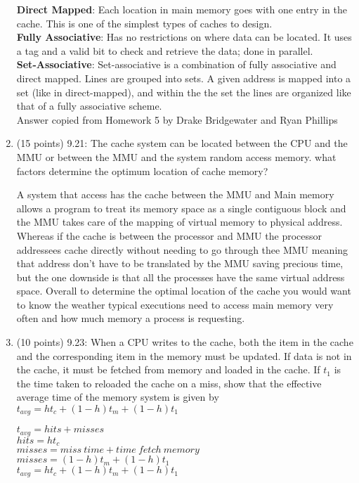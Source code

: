 \documentclass[letterpaper,10pt,onecolumn,titlepage]{article}
\begin{document}
\begin{enumerate}
\begin{mdframed}[style=MyFrame]
\textbf{Direct Mapped}: Each location in main memory goes with one entry in the cache. This is one of the simplest types of caches to design.\\
\textbf{Fully Associative}: Has no restrictions on where data can be located. It uses a tag and a valid bit to check and retrieve the data; done in parallel. \\
\textbf{Set-Associative}: Set-associative is a combination of fully associative and direct mapped. Lines are grouped into sets. A given address is mapped into a set (like in direct-mapped), and within the the set the lines are organized like that of a fully associative scheme. \\
Answer copied from Homework 5 by Drake Bridgewater and Ryan Phillips \cite{HW5}
\end{mdframed}
\item (15 points) 9.21: The cache system can be located between the CPU and the MMU or between the MMU and the system random access memory. what factors determine the optimum location of cache memory?
\begin{mdframed}[style=MyFrame]
A system that access has the cache between the MMU and Main memory allows a program to treat its memory space as a single contiguous block and the MMU takes care of the mapping of virtual memory to physical address.  Whereas if the cache is between the processor and MMU the processor addressees cache directly without needing to go through thee MMU meaning that address don't have to be translated by the MMU saving precious time, but the one downside is that all the processes have the same virtual address space. Overall to determine the optimal location of the cache you would want to know the weather typical executions need to access main memory very often and how much memory a process is requesting. 
\end{mdframed}

\newpage
\item (10 points) 9.23: When a CPU  writes to the cache, both the item in the cache and the corresponding item in the memory must be updated. If data is not in the cache, it must be fetched from memory and loaded in the cache. If $t_1$ is the time taken to reloaded the cache on a miss, show that the effective average time of the memory system is given by $t_{avg}=ht_c+(1-h)t_m+(1-h)t_1$

\begin{mdframed}[style=MyFrame]
 $t_{avg}=hits+misses$\\
 $hits=ht_c$\\
 $misses=miss~time+time~fetch~memory$\\
 $misses=(1-h)t_m+(1-h)t_1$\\
 $t_{avg}=ht_c+(1-h)t_m+(1-h)t_1$
 

\end{mdframed}
\end{enumerate}
\end{document}

